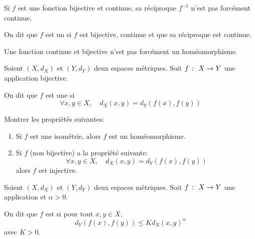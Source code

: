 \begin{remark}
    Si \(f\) est une fonction bijective et continue,
    sa réciproque \(f^{-1}\) n'est pas forcément continue.
\end{remark}

\begin{definition}
    On dit que \(f\) est un 
    si \(f\) est bijective, continue et que sa réciproque est continue.
\end{definition}

\begin{remark}
    Une fonction continue et bijective n'est pas forcément un homéomorphisme.
\end{remark}

\begin{definition}
    Soient \((X, d_X)\) et \((Y, d_Y)\) deux espaces métriques.
    Soit \(f\ \colon\  X \to Y\) une application bijective.

    On dit que \(f\) est une  si
    \begin{equation*}
        \forall x, y \in X, \quad d_X(x, y) = d_Y(f(x), f(y))
    \end{equation*}
\end{definition}

\begin{exercice}
    Montrer les propriétés suivantes:
    \begin{enumerate}[label=(\roman*)] %
        \item Si \(f\) est une isométrie, alors \(f\) est un homéomorphisme.

        \item Si \(f\) (non bijective) a la propriété suivante:
        \begin{equation*}
            \forall x, y \in X, \quad d_X(x, y) = d_Y(f(x), f(y))
        \end{equation*}
        alors \(f\) est injective.
    \end{enumerate}
\end{exercice}

\begin{definition}
    Soient \((X, d_X)\) et \((Y, d_Y)\) deux espaces métriques.
    Soit \(f\ \colon\  X \to Y\) une application et \(\alpha>0\).

    On dit que \(f\) est  si
    pour tout \(x, y \in X\),
    \begin{equation*}
        d_Y(f(x), f(y)) \leq K {d_X(x, y)}^\alpha
    \end{equation*}
    avec \(K > 0\).
\end{definition}

